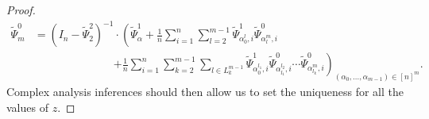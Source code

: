 \documentclass[a4papaer, titlepage]{book}
\begin{document}
\begin{proof}
  \begin{align}\label{eq:Psi_explicit}
    \tilde \Psi_m^0 
      &= (I_n - \tilde \Psi_2^{2})^{-1} \cdot \left(\tilde \Psi_\alpha^{1}
      +  \frac{1}{n} \sum_{i=1}^n\sum_{l=2}^{m-1} \tilde \Psi^{1}_{\alpha_0^{l}, i}\tilde \Psi^0_{\alpha_{l}^m, i}\right.\\
    &\hspace{3cm} \left.+ \frac{1}{n} \sum_{i=1}^n\sum_{k=2}^{m-1}\sum_{l\in L_k^{m-1}} \tilde \Psi^{1}_{\alpha_0^{l_1}, i} \tilde \Psi^0_{\alpha_{l_1}^{l_2}, i}\cdots \tilde \Psi^0_{\alpha_{l_k}^m, i} \right)_{(\alpha_0,\ldots, \alpha_{m-1}) \in [n]^m}.
   \end{align} 
   Complex analysis inferences should then allow us to set the uniqueness for all the values of $z$.


\end{proof}
\end{document}
